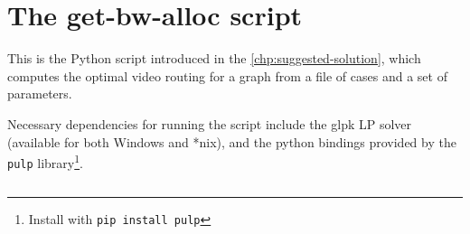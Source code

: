 \chapter{The get-bw-alloc script}
\label{chp:get-bw-alloc}

This is the Python script introduced in the \autoref{chp:suggested-solution}, which computes the optimal video routing for a graph from a file of cases and a set of parameters.

Necessary dependencies for running the script include the glpk LP solver (available for both Windows and *nix), and the python bindings provided by the \texttt{pulp} library\footnote{Install with \texttt{pip install pulp}}.

\inputminted[linenos,
               numbersep=5pt,
               frame=lines,
               framesep=2mm]{python}{tools/get_bw_glpk_intercontinental-asymmetric.py}
